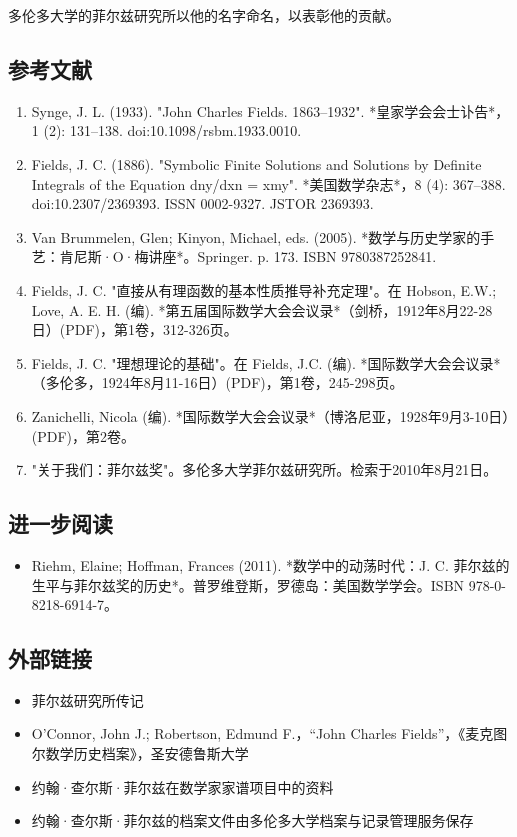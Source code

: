 多伦多大学的菲尔兹研究所以他的名字命名，以表彰他的贡献。
\subsection{参考文献}  
\begin{enumerate}
\item Synge, J. L. (1933). "John Charles Fields. 1863–1932". *皇家学会会士讣告*，1 (2): 131–138. doi:10.1098/rsbm.1933.0010.  
\item Fields, J. C. (1886). "Symbolic Finite Solutions and Solutions by Definite Integrals of the Equation dny/dxn = xmy". *美国数学杂志*，8 (4): 367–388. doi:10.2307/2369393. ISSN 0002-9327. JSTOR 2369393.  
\item Van Brummelen, Glen; Kinyon, Michael, eds. (2005). *数学与历史学家的手艺：肯尼斯·O·梅讲座*。Springer. p. 173. ISBN 9780387252841.  
\item Fields, J. C. "直接从有理函数的基本性质推导补充定理"。在 Hobson, E.W.; Love, A. E. H. (编). *第五届国际数学大会会议录*（剑桥，1912年8月22-28日）(PDF)，第1卷，312-326页。  
\item Fields, J. C. "理想理论的基础"。在 Fields, J.C. (编). *国际数学大会会议录*（多伦多，1924年8月11-16日）(PDF)，第1卷，245-298页。  
\item Zanichelli, Nicola (编). *国际数学大会会议录*（博洛尼亚，1928年9月3-10日）(PDF)，第2卷。  
\item "关于我们：菲尔兹奖"。多伦多大学菲尔兹研究所。检索于2010年8月21日。
\end{enumerate}
\subsection{进一步阅读}  
\begin{itemize}
\item Riehm, Elaine; Hoffman, Frances (2011). *数学中的动荡时代：J. C. 菲尔兹的生平与菲尔兹奖的历史*。普罗维登斯，罗德岛：美国数学学会。ISBN 978-0-8218-6914-7。
\end{itemize}
\subsection{外部链接}
\begin{itemize}
\item 菲尔兹研究所传记  
\item O'Connor, John J.; Robertson, Edmund F.，“John Charles Fields”，《麦克图尔数学历史档案》，圣安德鲁斯大学  
\item 约翰·查尔斯·菲尔兹在数学家家谱项目中的资料  
\item 约翰·查尔斯·菲尔兹的档案文件由多伦多大学档案与记录管理服务保存
\end{itemize}